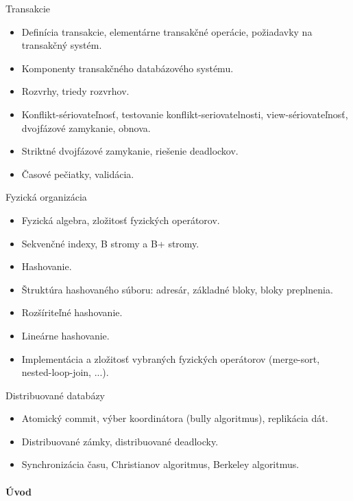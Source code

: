 \documentclass[a4paper]{report}
\begin{document}
\begin{zadanie}{Transakcie}
\begin{itemize}
 \item Definícia transakcie, elementárne transakčné operácie, požiadavky na transakčný systém.
 \item Komponenty transakčného databázového systému.
 \item Rozvrhy, triedy rozvrhov.
 \item Konflikt-sériovateľnosť, testovanie konflikt-seriovatelnosti, view-sériovateľnosť, dvojfázové zamykanie, obnova.
 \item Striktné dvojfázové zamykanie, riešenie deadlockov.
 \item Časové pečiatky, validácia.
\end{itemize}
\end{zadanie}

\begin{zadanie}{Fyzická organizácia}
\begin{itemize}
 \item Fyzická algebra, zložitosť fyzických operátorov.
 \item Sekvenčné indexy, B stromy a B+ stromy.
 \item Hashovanie.
 \item Štruktúra hashovaného súboru: adresár, základné bloky, bloky preplnenia.
 \item Rozšíriteľné hashovanie.
 \item Lineárne hashovanie.
 \item Implementácia a zložitosť vybraných fyzických operátorov (merge-sort, nested-loop-join, ...).
\end{itemize}
\end{zadanie}

\begin{zadanie}{Distribuované databázy}
\begin{itemize}
 \item Atomický commit, výber koordinátora (bully algoritmus), replikácia dát.
 \item Distribuované zámky, distribuované deadlocky.
 \item Synchronizácia času, Christianov algoritmus, Berkeley algoritmus.
\end{itemize}
\end{zadanie}

\paragraph*{Úvod}
\end{document}
